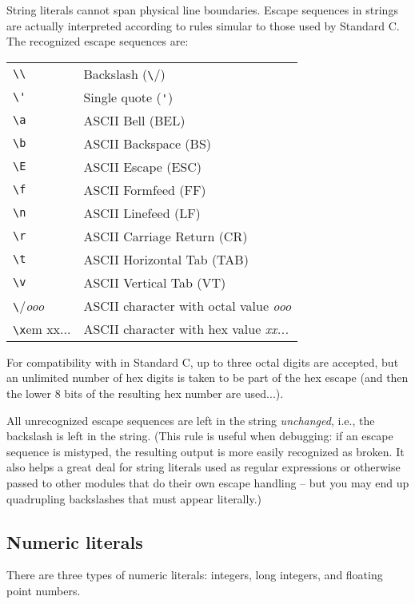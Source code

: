String literals cannot span physical line boundaries.  Escape
sequences in strings are actually interpreted according to rules
simular to those used by Standard C.  The recognized escape sequences
are:

\begin{center}
\begin{tabular}{|l|l|}
\hline
\verb/\\/	& Backslash (\verb/\/) \\
\verb/\'/	& Single quote (\verb/'/) \\
\verb/\a/	& ASCII Bell (BEL) \\
\verb/\b/	& ASCII Backspace (BS) \\
\verb/\E/	& ASCII Escape (ESC) \\
\verb/\f/	& ASCII Formfeed (FF) \\
\verb/\n/	& ASCII Linefeed (LF) \\
\verb/\r/	& ASCII Carriage Return (CR) \\
\verb/\t/	& ASCII Horizontal Tab (TAB) \\
\verb/\v/	& ASCII Vertical Tab (VT) \\
\verb/\/{\em ooo}	& ASCII character with octal value {\em ooo} \\
\verb/\x/{em xx...}	& ASCII character with hex value {\em xx...} \\
\hline
\end{tabular}
\end{center}

For compatibility with in Standard C, up to three octal digits are
accepted, but an unlimited number of hex digits is taken to be part of
the hex escape (and then the lower 8 bits of the resulting hex number
are used...).

All unrecognized escape sequences are left in the string {\em
unchanged}, i.e., the backslash is left in the string.  (This rule is
useful when debugging: if an escape sequence is mistyped, the
resulting output is more easily recognized as broken.  It also helps a
great deal for string literals used as regular expressions or
otherwise passed to other modules that do their own escape handling --
but you may end up quadrupling backslashes that must appear literally.)

\subsection{Numeric literals}

There are three types of numeric literals: integers, long integers,
and floating point numbers.

